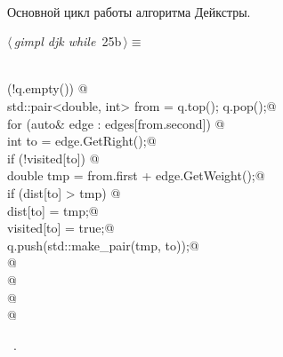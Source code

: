\documentclass[12pt]{article}
\begin{document}
\paragraph{}
Основной цикл работы алгоритма Дейкстры.
\begin{flushleft} \small
\begin{minipage}{\linewidth}\label{scrap41}\raggedright\small
{} $\langle\,${\itshape gimpl djk while}\nobreak\ {\footnotesize {25b}}$\,\rangle\equiv$
\vspace{-1ex}
\begin{list}{}{} \item
\mbox{}\verb@@\\
\mbox{}\verb@while (!q.empty()) {@\\
\mbox{}\verb@        std::pair<double, int> from = q.top(); q.pop();@\\
\mbox{}\verb@        for (auto& edge : edges[from.second]) {@\\
\mbox{}\verb@            int to = edge.GetRight();@\\
\mbox{}\verb@            if (!visited[to]) {@\\
\mbox{}\verb@                double tmp = from.first + edge.GetWeight();@\\
\mbox{}\verb@                if (dist[to] > tmp) {@\\
\mbox{}\verb@                    dist[to] = tmp;@\\
\mbox{}\verb@                    visited[to] = true;@\\
\mbox{}\verb@                    q.push(std::make_pair(tmp, to));@\\
\mbox{}\verb@                }@\\
\mbox{}\verb@            }@\\
\mbox{}\verb@        }@\\
\mbox{}\verb@    } @\\
\mbox{}\verb@@{\NWsep}
\end{list}
\vspace{-1.5ex}
\footnotesize
\begin{list}{}{\setlength{\itemsep}{-\parsep}\setlength{\itemindent}{-\leftmargin}}
\item \NWtxtMacroRefIn\ .

\item{}
\end{list}
\end{minipage}\vspace{4ex}
\end{flushleft}
\end{document}
